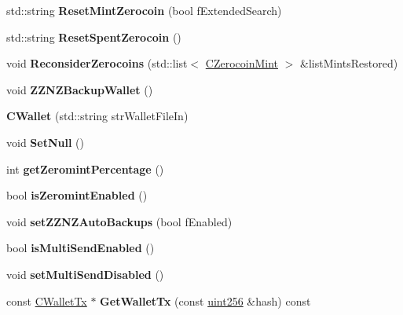 \begin{DoxyCompactItemize}
std\+::string {\bfseries Reset\+Mint\+Zerocoin} (bool f\+Extended\+Search)
\item 
\mbox{\label{class_c_wallet_abc70af84f54700a62cf8ef530f6faaaa}} 
std\+::string {\bfseries Reset\+Spent\+Zerocoin} ()
\item 
\mbox{\label{class_c_wallet_ae0d869b52e1efd245bd5fcbbff925531}} 
void {\bfseries Reconsider\+Zerocoins} (std\+::list$<$ \mbox{\hyperlink{class_c_zerocoin_mint}{C\+Zerocoin\+Mint}} $>$ \&list\+Mints\+Restored)
\item 
\mbox{\label{class_c_wallet_a4964ea0507ddde7debb4d09ff075fd5e}} 
void {\bfseries Z\+Z\+N\+Z\+Backup\+Wallet} ()
\item 
\mbox{\label{class_c_wallet_a43878f79c7bc54f7af0884aa1da07b59}} 
{\bfseries C\+Wallet} (std\+::string str\+Wallet\+File\+In)
\item 
\mbox{\label{class_c_wallet_aba7996da1912459832dcbffdaed933a3}} 
void {\bfseries Set\+Null} ()
\item 
\mbox{\label{class_c_wallet_a2e9747db8ae491c751aac528b6e66752}} 
int {\bfseries get\+Zeromint\+Percentage} ()
\item 
\mbox{\label{class_c_wallet_a7c87d2cb8aa49a99a8a2ee4bd6bfc438}} 
bool {\bfseries is\+Zeromint\+Enabled} ()
\item 
\mbox{\label{class_c_wallet_a802efabb8db272cacd3a4b860a93300f}} 
void {\bfseries set\+Z\+Z\+N\+Z\+Auto\+Backups} (bool f\+Enabled)
\item 
\mbox{\label{class_c_wallet_aea9ec908c62d5d1bdb71e2eb7309c0eb}} 
bool {\bfseries is\+Multi\+Send\+Enabled} ()
\item 
\mbox{\label{class_c_wallet_ad6858daeeda6f2615e5cf9a1c2f3c20e}} 
void {\bfseries set\+Multi\+Send\+Disabled} ()
\item 
const \mbox{\hyperlink{class_c_wallet_tx}{C\+Wallet\+Tx}} $\ast$ {\bfseries Get\+Wallet\+Tx} (const \mbox{\hyperlink{classuint256}{uint256}} \&hash) const
\item 

\end{DoxyCompactItemize}
